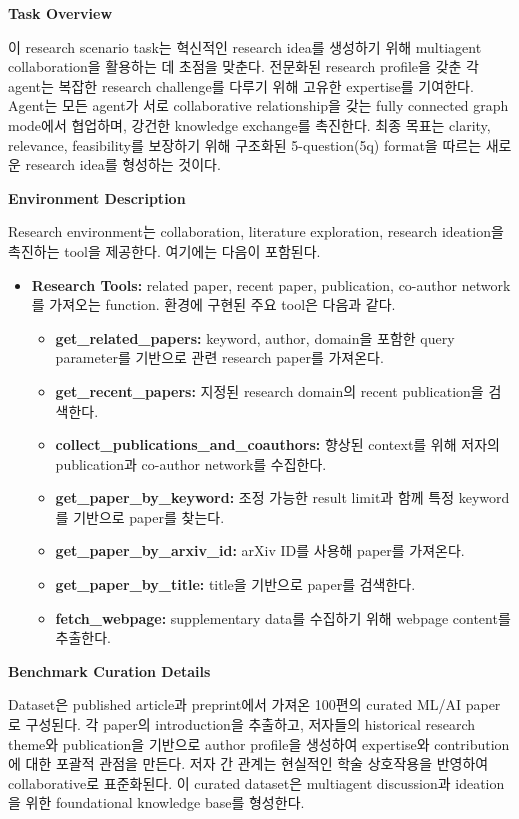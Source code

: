 \textbf{Task Overview}

이 research scenario task는 혁신적인 research idea를 생성하기 위해 multiagent collaboration을 활용하는 데 초점을 맞춘다. 전문화된 research profile을 갖춘 각 agent는 복잡한 research challenge를 다루기 위해 고유한 expertise를 기여한다. Agent는 모든 agent가 서로 collaborative relationship을 갖는 fully connected graph mode에서 협업하며, 강건한 knowledge exchange를 촉진한다. 최종 목표는 clarity, relevance, feasibility를 보장하기 위해 구조화된 5-question(5q) format을 따르는 새로운 research idea를 형성하는 것이다.

\textbf{Environment Description}

Research environment는 collaboration, literature exploration, research ideation을 촉진하는 tool을 제공한다. 여기에는 다음이 포함된다.
\begin{itemize}
    \item \textbf{Research Tools:} related paper, recent paper, publication, co-author network를 가져오는 function. 환경에 구현된 주요 tool은 다음과 같다.
    \begin{itemize}
        \item \textbf{get\_related\_papers:} keyword, author, domain을 포함한 query parameter를 기반으로 관련 research paper를 가져온다.
        \item \textbf{get\_recent\_papers:} 지정된 research domain의 recent publication을 검색한다.
        \item \textbf{collect\_publications\_and\_coauthors:} 향상된 context를 위해 저자의 publication과 co-author network를 수집한다.
        \item \textbf{get\_paper\_by\_keyword:} 조정 가능한 result limit과 함께 특정 keyword를 기반으로 paper를 찾는다.
        \item \textbf{get\_paper\_by\_arxiv\_id:} arXiv ID를 사용해 paper를 가져온다.
        \item \textbf{get\_paper\_by\_title:} title을 기반으로 paper를 검색한다.
        \item \textbf{fetch\_webpage:} supplementary data를 수집하기 위해 webpage content를 추출한다.
    \end{itemize}
\end{itemize}

\textbf{Benchmark Curation Details}

Dataset은 published article과 preprint에서 가져온 100편의 curated ML/AI paper로 구성된다. 각 paper의 introduction을 추출하고, 저자들의 historical research theme와 publication을 기반으로 author profile을 생성하여 expertise와 contribution에 대한 포괄적 관점을 만든다. 저자 간 관계는 현실적인 학술 상호작용을 반영하여 collaborative로 표준화된다. 이 curated dataset은 multiagent discussion과 ideation을 위한 foundational knowledge base를 형성한다.

